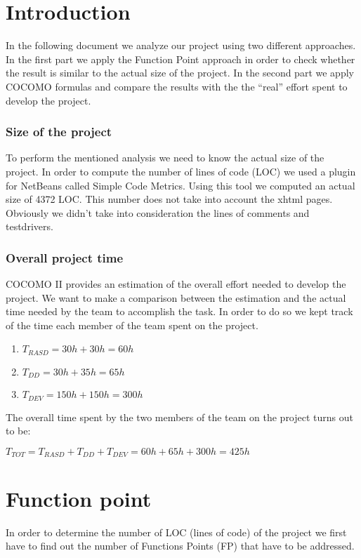 \documentclass[10pt,a4paper,titlepage]{article}
\begin{document}


\tableofcontents

\pagebreak
\part{Introduction}
In the following document we analyze our project using two different approaches.  
In the first part we apply the Function Point approach in order to check whether the result is 
similar to the actual size of the project. 
In the second part we apply COCOMO formulas and compare the results with the the ``real'' 
effort spent to develop the project.  

\section{Size of the project}
To perform the mentioned analysis we need to know the actual size of the project.  
In order to compute the number of lines of code (LOC) we used a plugin for NetBeans called 
Simple Code Metrics. 
Using this tool we computed an actual size of 4372 LOC. 
This number does not take into account the xhtml pages. Obviously we didn't take into consideration the lines of comments and testdrivers.
 
\section{Overall project time}
COCOMO II provides an estimation of the overall effort needed to develop the project.  
We want to make a comparison between the estimation and the actual time needed by the 
team to accomplish the task. 
In order to do so we kept track of the time each member of the team spent on the project. 
\begin{enumerate}
\item $T_{RASD} = 30h+30h=60h$
\item $T_{DD} = 30h+35h=65h$
\item $T_{DEV} = 150h+150h=300h$
\end{enumerate}
The overall time spent by the two members of the team on the project turns out to be:

$T_{TOT} = T_{RASD}+T_{DD}+T_{DEV} = 60h+65h+300h = 425h$
 
\pagebreak
\part{Function point}
In order to determine the number of LOC (lines of code) of the project we first have to find out 
the number of Functions Points (FP) that have to be addressed.  
\end{document}
